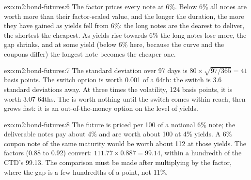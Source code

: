 \begin{solution}{exo:m2:bond-futures:6}
The factor prices every note at 6\%. Below 6\% all notes are worth more than
their factor-scaled value, and the longer the duration, the more they have
gained as yields fell from 6\%: the long notes are the dearest to deliver, the
shortest the cheapest. As yields rise towards 6\% the long notes lose more,
the gap shrinks, and at some yield (below 6\% here, because the curve and the
coupons differ) the longest note becomes the cheaper one.
\end{solution}

\begin{solution}{exo:m2:bond-futures:7}
The standard deviation over 97 days is $80 \times \sqrt{97/365} = 41$ basis points.
The switch option is worth 0.001 of a 64th: the switch is 3.6 standard
deviations away. At three times the volatility, 124 basis points, it is worth
3.07 64ths. The  is worth nothing until the switch comes within
reach, then grows fast: it is an out-of-the-money option on the level of
yields.
\end{solution}

\begin{solution}{exo:m2:bond-futures:8}
The future is priced per 100 of a notional 6\% note; the deliverable notes pay
about 4\% and are worth about 100 at 4\% yields. A 6\% coupon note of the same
maturity would be worth about 112 at those yields. The factors (0.88 to 0.92)
convert: $111.77 \times 0.887 = 99.14$, within a hundredth of the CTD's 99.13. The comparison must be
made after multiplying by the factor, where the gap is a few hundredths of a
point, not 11\%.
\end{solution}

